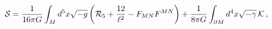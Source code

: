 \begin{equation}
{\cal{S}}=\frac{1}{16\pi G}\int_M d^5x\sqrt{-g}\left({\cal R}_5+
\frac{12}{\ell^2}- F_{MN} F^{MN}\right) +
\frac{1}{8\pi G}\int_{\partial M} d^4 x \sqrt{-\gamma}\,{\cal{K}}\,,
\end{equation}

